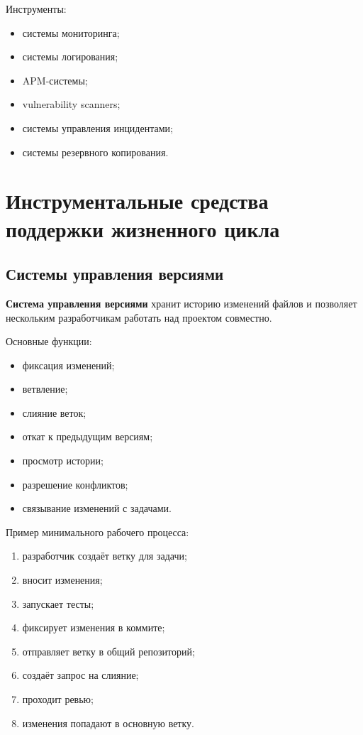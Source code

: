 \documentclass[12pt,a4paper]{article}
\begin{document}
Инструменты:
\begin{itemize}
    \item системы мониторинга;
    \item системы логирования;
    \item APM-системы;
    \item vulnerability scanners;
    \item системы управления инцидентами;
    \item системы резервного копирования.
\end{itemize}

\section{Инструментальные средства поддержки жизненного цикла}

\subsection{Системы управления версиями}

\textbf{Система управления версиями} хранит историю изменений файлов и позволяет нескольким разработчикам работать над проектом совместно.

Основные функции:
\begin{itemize}
    \item фиксация изменений;
    \item ветвление;
    \item слияние веток;
    \item откат к предыдущим версиям;
    \item просмотр истории;
    \item разрешение конфликтов;
    \item связывание изменений с задачами.
\end{itemize}

Пример минимального рабочего процесса:
\begin{enumerate}
    \item разработчик создаёт ветку для задачи;
    \item вносит изменения;
    \item запускает тесты;
    \item фиксирует изменения в коммите;
    \item отправляет ветку в общий репозиторий;
    \item создаёт запрос на слияние;
    \item проходит ревью;
    \item изменения попадают в основную ветку.
\end{enumerate}
\end{document}
